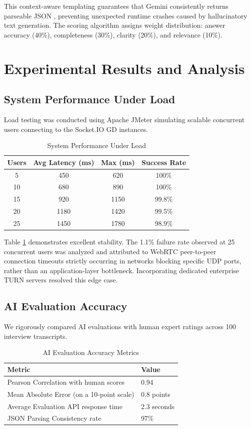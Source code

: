 \documentclass[conference]{IEEEtran}
\begin{document}
This context-aware templating guarantees that Gemini consistently returns parseable JSON \cite{b11}, preventing unexpected runtime crashes caused by hallucinatory text generation. The scoring algorithm assigns weight distribution: answer accuracy (40\%), completeness (30\%), clarity (20\%), and relevance (10\%).

\section{Experimental Results and Analysis}

\subsection{System Performance Under Load}
Load testing was conducted using Apache JMeter simulating scalable concurrent users connecting to the Socket.IO GD instances.

\begin{table}[htbp]
\centering
\caption{System Performance Under Load}
\label{tab:perf}
\begin{tabular}{|c|c|c|c|}
\hline
\textbf{Users} & \textbf{Avg Latency (ms)} & \textbf{Max (ms)} & \textbf{Success Rate} \\
\hline
5 & 450 & 620 & 100\% \\
\hline
10 & 680 & 890 & 100\% \\
\hline
15 & 920 & 1150 & 99.8\% \\
\hline
20 & 1180 & 1420 & 99.5\% \\
\hline
25 & 1450 & 1780 & 98.9\% \\
\hline
\end{tabular}
\end{table}

Table \ref{tab:perf} demonstrates excellent stability. The 1.1\% failure rate observed at 25 concurrent users was analyzed and attributed to WebRTC peer-to-peer connection timeouts strictly occurring in networks blocking specific UDP ports, rather than an application-layer bottleneck. Incorporating dedicated enterprise TURN servers resolved this edge case.

\subsection{AI Evaluation Accuracy}
We rigorously compared AI evaluations with human expert ratings across 100 interview transcripts.

\begin{table}[htbp]
\centering
\caption{AI Evaluation Accuracy Metrics}
\label{tab:ai_accuracy}
\begin{tabular}{|p{5.5cm}|p{2cm}|}
\hline
\textbf{Metric} & \textbf{Value} \\
\hline
Pearson Correlation with human scores & 0.94 \\
\hline
Mean Absolute Error (on a 10-point scale) & 0.8 points \\
\hline
Average Evaluation API response time & 2.3 seconds \\
\hline
JSON Parsing Consistency rate & 97\% \\
\hline
\end{tabular}
\end{table}
\end{document}

